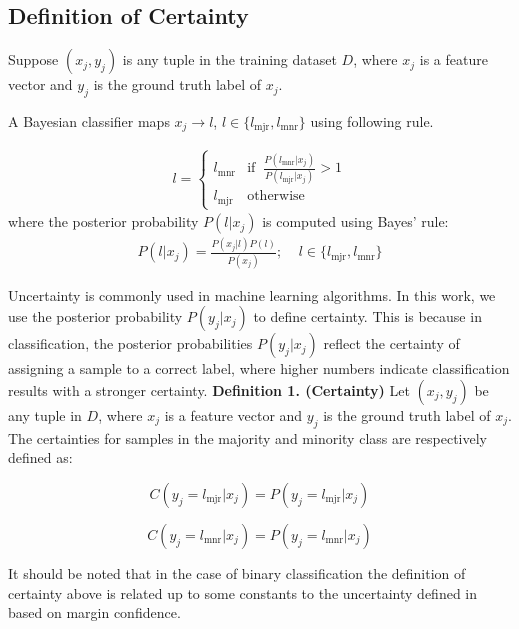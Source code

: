 \documentclass[10pt,journal,compsoc]{IEEEtran}
\begin{document}
\subsection{Definition of Certainty}
Suppose $(x_j, y_j)$ is any tuple in the training dataset $D$, where $x_j$ is a feature vector and $y_j$ is the ground truth label of $x_j$.

A Bayesian classifier maps $x_j \rightarrow l$, $l\in\{l_{\mbox{mjr}}, l_{\mbox{mnr}}\}$ using following rule. 

\begin{align*}
l = \left\{
\begin{array}{cl}
  l_{\mbox{mnr}} & \text{if} \;\; \frac{P(l_{\mbox{mnr}} | x_j)}{P(l_{\mbox{mjr}} | x_j)} > 1\\
  l_{\mbox{mjr}} & \text{otherwise}
\end{array}\right.
\end{align*}
where the posterior probability $P(l|x_j)$ is computed using Bayes' rule:
\begin{align*}
P(l | x_j) = \frac{P(x_j | l)P(l)}{P(x_j)}; \;\;\;\; l\in\{l_{\mbox{mjr}}, l_{\mbox{mnr}}\}
\end{align*}
 
Uncertainty is commonly used in machine learning algorithms. In this work, we use the posterior probability $P(y_j | x_j)$ to define certainty. This is because in classification, the posterior probabilities $P(y_j | x_j)$ reflect the certainty of assigning a sample to a correct label, where higher numbers indicate classification results with a stronger certainty.
\newline
\newline
\noindent \textbf{Definition 1. (Certainty)} Let $(x_j, y_j)$ be any tuple in $D$, where $x_j$ is a feature vector and $y_j$ is the ground truth label of $x_j$. The certainties for samples in the majority and minority class are respectively defined as:

\begin{equation}
C(y_j=l_{\mbox{mjr}} | x_j) = P(y_j=l_{\mbox{mjr}}|x_j)
\end{equation}

\begin{equation}
C(y_j=l_{\mbox{mnr}} | x_j) = P(y_j=l_{\mbox{mnr}}|x_j)
\end{equation} 

It should be noted that in the case of binary classification the definition of certainty above is related up to some constants to the uncertainty defined in \cite{2013Sharma} based on margin confidence.
\end{document}
